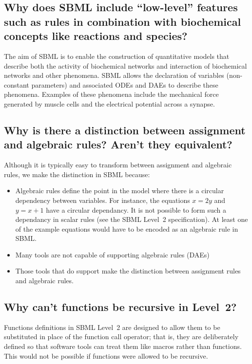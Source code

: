 \documentclass{sbmlfaq}
\begin{document}
\subsection{Why does SBML include ``low-level'' features such as rules in
  combination with biochemical concepts like reactions and species?} 

The aim of SBML is to enable the construction of quantitative models that
describe both the activity of biochemical networks and interaction of
biochemical networks and other phenomena.  SBML allows the declaration of
variables (non-constant parameters) and associated ODEs and DAEs to
describe these phenomena.  Examples of these phenomena include the
mechanical force generated by muscle cells and the electrical potential
across a synapse.

\subsection{Why is there a distinction between assignment and algebraic rules?
  Aren't they equivalent?}

Although it is typically easy to transform between assignment and algebraic
rules, we make the distinction in SBML because:
\begin{itemize}

\item Algebraic rules define the point in the model where there is a circular
  dependency between variables.  For instance, the equations $x = 2y$ and $y = x + 1$
  have a circular dependancy.  It is not possible to form such a dependancy in
  scalar rules (see the SBML Level~2 specification).  At least one of the example
  equations would have to be encoded as an algebraic rule in SBML.
  
\item Many tools are not capable of supporting algebraic rules (DAEs)
  
\item Those tools that do support make the distinction between assignment rules
  and algebraic rules.

\end{itemize}


\subsection{Why can't functions be recursive in Level~2?}

Functions definitions in SBML Level~2 are designed to allow them to be
substituted in place of the function call operator; that is, they are
deliberately defined so that software tools can treat them like macros
rather than functions.  This would not be possible if functions were
allowed to be recursive.
\end{document}

